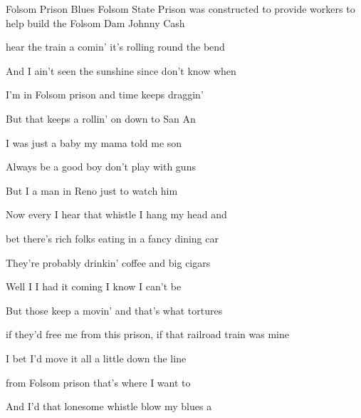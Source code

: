 \begin{SBSong}{Folsom Prison Blues}
  {Folsom State Prison was constructed to provide workers to help build the Folsom Dam}
  {Johnny Cash}
  \begin{SBVerse}
     hear the train a comin' it's rolling round the bend
    
    And I ain't seen the sunshine since  don't know when
    
    I'm  in Folsom prison and time keeps draggin' 
    
    But that  keeps a rollin' on down to San An
  \end{SBVerse}
  \begin{SBVerse}
     I was just a baby my mama told me son
    
    Always be a good boy don't  play with guns
    
    But I  a man in Reno just to watch him 
    
    Now every  I hear that whistle I hang my head and 
  \end{SBVerse}
  \begin{SBVerse}
     bet there's rich folks eating in a fancy dining car
    
    They're probably drinkin' coffee and  big cigars
    
    Well I  I had it coming I know I can't be 
    
    But those  keep a movin' and that's what tortures 
  \end{SBVerse}
  \begin{SBVerse}
     if they'd free me from this prison, \WBLineBrk if that railroad train was mine
    
    I bet I'd move it all a little  down the line
    
     from Folsom prison that's where I want to 
    
    And I'd  that lonesome whistle blow my blues a
 \end{SBVerse}
\end{SBSong}
